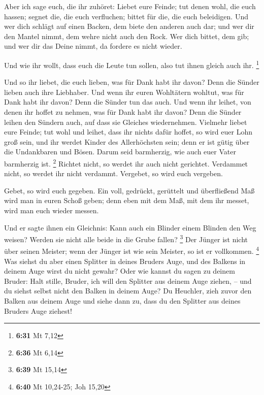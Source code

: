  Aber ich sage euch, die ihr zuhöret: Liebet eure Feinde;
tut denen wohl, die euch hassen;  segnet die, die euch
verfluchen; bittet für die, die euch beleidigen.  Und wer
dich schlägt auf einen Backen, dem biete den anderen auch dar; und wer
dir den Mantel nimmt, dem wehre nicht auch den Rock.  Wer
dich bittet, dem gib; und wer dir das Deine nimmt, da fordere es nicht
wieder.

 Und wie ihr wollt, dass euch die Leute tun sollen, also
tut ihnen gleich auch ihr. \footnote{\textbf{6:31} Mt 7,12}

 Und so ihr liebet, die euch lieben, was für Dank habt ihr
davon? Denn die Sünder lieben auch ihre Liebhaber.  Und
wenn ihr euren Wohltätern wohltut, was für Dank habt ihr davon? Denn die
Sünder tun das auch.  Und wenn ihr leihet, von denen ihr
hoffet zu nehmen, was für Dank habt ihr davon? Denn die Sünder leihen
den Sündern auch, auf dass sie Gleiches wiedernehmen. 
Vielmehr liebet eure Feinde; tut wohl und leihet, dass ihr nichts dafür
hoffet, so wird euer Lohn groß sein, und ihr werdet Kinder des
Allerhöchsten sein; denn er ist gütig über die Undankbaren und Bösen.
 Darum seid barmherzig, wie auch euer Vater barmherzig ist.
\footnote{\textbf{6:36} Mt 6,14}  Richtet nicht, so werdet
ihr auch nicht gerichtet. Verdammet nicht, so werdet ihr nicht verdammt.
Vergebet, so wird euch vergeben.

 Gebet, so wird euch gegeben. Ein voll, gedrückt, gerüttelt
und überfließend Maß wird man in euren Schoß geben; denn eben mit dem
Maß, mit dem ihr messet, wird man euch wieder messen.

 Und er sagte ihnen ein Gleichnis: Kann auch ein Blinder
einem Blinden den Weg weisen? Werden sie nicht alle beide in die Grube
fallen? \footnote{\textbf{6:39} Mt 15,14}  Der Jünger ist
nicht über seinen Meister; wenn der Jünger ist wie sein Meister, so ist
er vollkommen. \footnote{\textbf{6:40} Mt 10,24-25; Joh 15,20}
 Was siehst du aber einen Splitter in deines Bruders Auge,
und des Balkens in deinem Auge wirst du nicht gewahr?  Oder
wie kannst du sagen zu deinem Bruder: Halt stille, Bruder, ich will den
Splitter aus deinem Auge ziehen, -- und du siehst selbst nicht den
Balken in deinem Auge? Du Heuchler, zieh zuvor den Balken aus deinem
Auge und siehe dann zu, dass du den Splitter aus deines Bruders Auge
ziehest!


